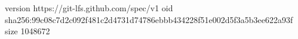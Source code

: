 version https://git-lfs.github.com/spec/v1
oid sha256:99c08c7d2c092f481c2d4731d74786ebbb434228f51e002d5f3a5b3ee622a93f
size 1048672
